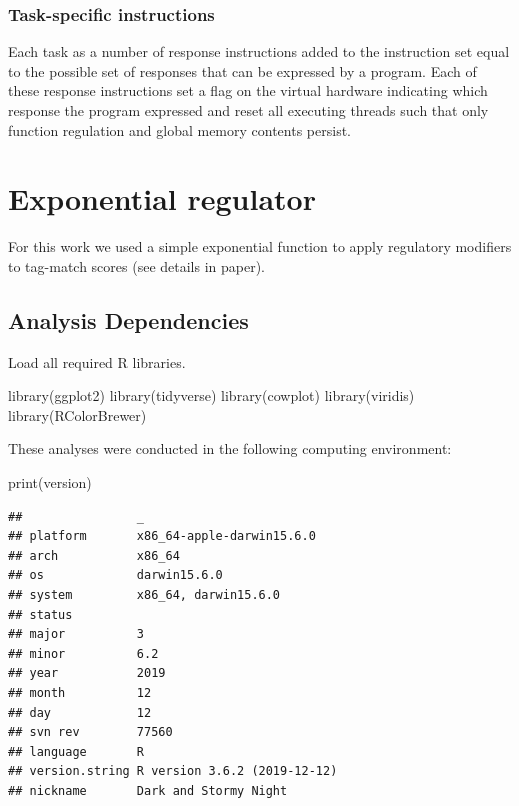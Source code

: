 \documentclass[
]{book}
\newenvironment{Shaded}{\begin{snugshade}}{\end{snugshade}}
\newcommand{\FunctionTok}[1]{\textcolor[rgb]{0.00,0.00,0.00}{#1}}
\newcommand{\NormalTok}[1]{#1}
\begin{document}
\hypertarget{task-specific-instructions}{%
\subsection{Task-specific instructions}\label{task-specific-instructions}}

Each task as a number of response instructions added to the instruction set equal to the possible set
of responses that can be expressed by a program. Each of these response instructions set a
flag on the virtual hardware indicating which response the program expressed and reset all executing
threads such that only function regulation and global memory contents persist.

\hypertarget{exponential-regulator}{%
\chapter{Exponential regulator}\label{exponential-regulator}}

For this work we used a simple exponential function to apply regulatory modifiers to tag-match scores (see details in paper).

\hypertarget{analysis-dependencies}{%
\section{Analysis Dependencies}\label{analysis-dependencies}}

Load all required R libraries.

\begin{Shaded}
\begin{Highlighting}[]
\FunctionTok{library}\NormalTok{(ggplot2)}
\FunctionTok{library}\NormalTok{(tidyverse)}
\FunctionTok{library}\NormalTok{(cowplot)}
\FunctionTok{library}\NormalTok{(viridis)}
\FunctionTok{library}\NormalTok{(RColorBrewer)}
\end{Highlighting}
\end{Shaded}

These analyses were conducted in the following computing environment:

\begin{Shaded}
\begin{Highlighting}[]
\FunctionTok{print}\NormalTok{(version)}
\end{Highlighting}
\end{Shaded}

\begin{verbatim}
##                _                           
## platform       x86_64-apple-darwin15.6.0   
## arch           x86_64                      
## os             darwin15.6.0                
## system         x86_64, darwin15.6.0        
## status                                     
## major          3                           
## minor          6.2                         
## year           2019                        
## month          12                          
## day            12                          
## svn rev        77560                       
## language       R                           
## version.string R version 3.6.2 (2019-12-12)
## nickname       Dark and Stormy Night
\end{verbatim}
\end{document}
